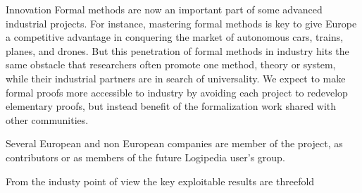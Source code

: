Innovation Formal methods are now an important part of some advanced
industrial projects. For instance, mastering formal methods is key to
give Europe a competitive advantage in conquering the market of
autonomous cars, trains, planes, and drones. But this penetration of
formal methods in industry hits the same obstacle that researchers
often promote one method, theory or system, while their industrial
partners are in search of universality. We expect to make formal
proofs more accessible to industry by avoiding each project to
redevelop elementary proofs, but instead benefit of the formalization
work shared with other communities.

Several European and non European companies are member of the project,
as contributors or as members of the future {\sc Logipedia} user's group.

From the industy point of view the key exploitable results are threefold

